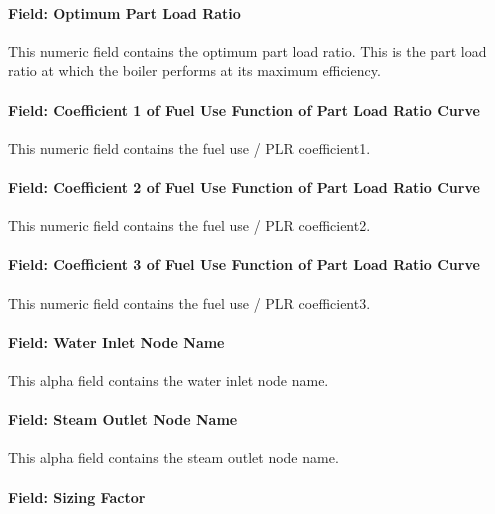 \paragraph{Field: Optimum Part Load Ratio}\label{field-optimum-part-load-ratio-10}

This numeric field contains the optimum part load ratio. This is the part load ratio at which the boiler performs at its maximum efficiency.

\paragraph{Field: Coefficient 1 of Fuel Use Function of Part Load Ratio Curve}\label{field-coefficient-1-of-fuel-use-function-of-part-load-ratio-curve}

This numeric field contains the fuel use / PLR coefficient1.

\paragraph{Field: Coefficient 2 of Fuel Use Function of Part Load Ratio Curve}\label{field-coefficient-2-of-fuel-use-function-of-part-load-ratio-curve}

This numeric field contains the fuel use / PLR coefficient2.

\paragraph{Field: Coefficient 3 of Fuel Use Function of Part Load Ratio Curve}\label{field-coefficient-3-of-fuel-use-function-of-part-load-ratio-curve}

This numeric field contains the fuel use / PLR coefficient3.

\paragraph{Field: Water Inlet Node Name}\label{field-water-inlet-node-name-001}

This alpha field contains the water inlet node name.

\paragraph{Field: Steam Outlet Node Name}\label{field-steam-outlet-node-name}

This alpha field contains the steam outlet node name.

\paragraph{Field: Sizing Factor}\label{field-sizing-factor-11}

